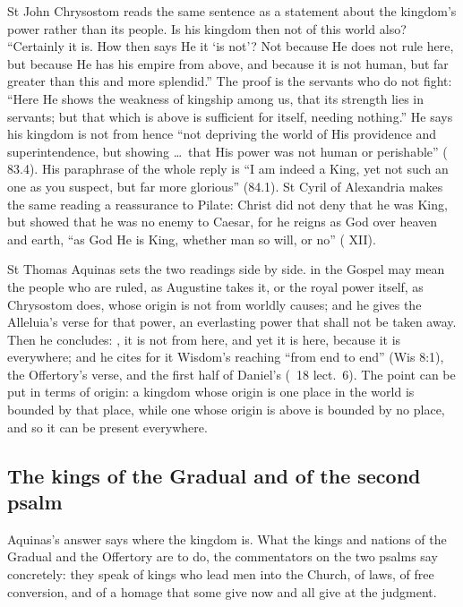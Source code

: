 St John Chrysostom reads the same sentence as a statement about the kingdom's
power rather than its people. Is his kingdom then not of this world also?
``Certainly it is. How then says He it `is not'? Not because He does not rule
here, but because He has his empire from above, and because it is not human,
but far greater than this and more splendid.'' The proof is the servants who do
not fight: ``Here He shows the weakness of kingship among us, that its strength
lies in servants; but that which is above is sufficient for itself, needing
nothing.'' He says his kingdom is not from hence ``not depriving the world of
His providence and superintendence, but showing \dots\ that His power was not
human or perishable'' ( 83.4). His paraphrase of the
whole reply is ``I am indeed a King, yet not such an one as you suspect, but far
more glorious'' (84.1). St Cyril of Alexandria makes the same reading a
reassurance to Pilate: Christ did not deny that he was King, but showed that he
was no enemy to Caesar, for he reigns as God over heaven and earth, ``as God He
is King, whether man so will, or no'' ( XII).

St Thomas Aquinas sets the two readings side by side.  in the
Gospel may mean the people who are ruled, as Augustine takes it, or the royal
power itself, as Chrysostom does, whose origin is not from worldly causes; and
he gives the Alleluia's verse for that power, an everlasting power that shall
not be taken away. Then he concludes: , it is not from here, and yet it is here, because it is everywhere; and he
cites for it Wisdom's reaching ``from end to end'' (Wis 8:1), the Offertory's
verse, and the first half of Daniel's (\ 18 lect.~6). The
point can be put in terms of origin: a kingdom whose origin is one place in
the world is bounded by that place, while one whose origin is above is bounded
by no place, and so it can be present everywhere.

\subsection{The kings of the Gradual and of the second psalm}
\label{sec:hence-kings}

Aquinas's answer says where the kingdom is. What the kings and nations of the
Gradual and the Offertory are to do, the commentators on the two psalms say
concretely: they speak of kings who lead men into the Church, of laws, of free
conversion, and of a homage that some give now and all give at the
judgment.

